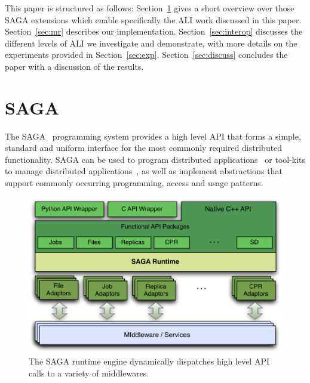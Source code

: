 \documentclass[3p,twocolumn]{elsarticle}
\begin{document}


This paper is structured as follows: Section~\ref{sec:saga} gives a
short overview over those SAGA extensions which enable specifically
the ALI work discussed in this paper.  Section~\ref{sec:mr} describes
our \smr implementation.  Section~\ref{sec:interop} discusses the
different levels of ALI we investigate and demonstrate, with more
details on the experiments provided in Section~\ref{sec:exp}.
Section~\ref{sec:discuss} concludes the paper with a discussion of the
results.




\section{SAGA}
\label{sec:saga}

The SAGA~\cite{saga-core, Kaiser:2006qp} programming system provides a
high level API that forms a simple, standard and uniform interface for
the most commonly required distributed functionality.  SAGA can be
used to program distributed applications~\cite{saga_escience07,
saga_tg08} or tool-kits to manage distributed
applications~\cite{Luckow:2008xy}, as well as implement abstractions
that support commonly occurring programming, access and usage
patterns.

\begin{figure}[t]
 \dnnn
 \includegraphics[scale=0.5]{figures/saga-figure02.pdf}
 \caption{The SAGA runtime engine dynamically dispatches high level
          API calls to a variety of middlewares.}
 \label{fig:saga}
\end{figure}
\end{document}

